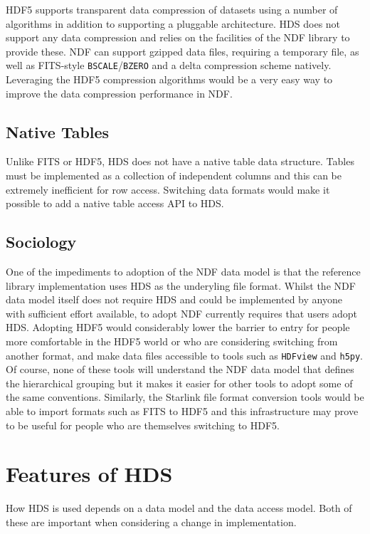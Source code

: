 \documentclass[final,authoryear,5p,times,twocolumn]{elsarticle}
\begin{document}
HDF5 supports transparent data compression of datasets using a number
of algorithms in addition to supporting a pluggable architecture. HDS
does not support any data compression and relies on the facilities of
the NDF library to provide these. NDF can support gzipped data files,
requiring a temporary file, as well as FITS-style
\texttt{BSCALE}/\texttt{BZERO} and a delta compression scheme
natively. Leveraging the HDF5 compression algorithms would be a very
easy way to improve the data compression performance in NDF.

\subsection{Native Tables}

Unlike FITS \citep{1988A&AS...73..365H} or HDF5, HDS does not have a
native table data structure. Tables must be implemented as a
collection of independent columns and this can be extremely
inefficient for row access. Switching data formats would make it
possible to add a native table access API to HDS.

\subsection{Sociology}

One of the impediments to adoption of the NDF data model is that the
reference library implementation uses HDS as the underyling file
format. Whilst the NDF data model itself does not require HDS and
could be implemented by anyone with sufficient effort available, to
adopt NDF currently requires that users adopt HDS.
Adopting HDF5 would considerably lower the barrier to entry for people
more comfortable in the HDF5 world or who are considering switching
from another format, and make
data files accessible to tools such as \texttt{HDFview} and
\texttt{h5py}. Of course, none of these tools will understand the NDF
data model that defines the hierarchical grouping but it makes it
easier for other tools to adopt some of the same conventions.
Similarly, the Starlink file format conversion tools \citep{SUN55} would be able
to import formats such as FITS to HDF5 and this infrastructure may
prove to be useful for people who are themselves switching to HDF5.

\section{Features of HDS}

How HDS is used depends on a data model and the data access
model. Both of these are important when considering a change in
implementation.
\end{document}
